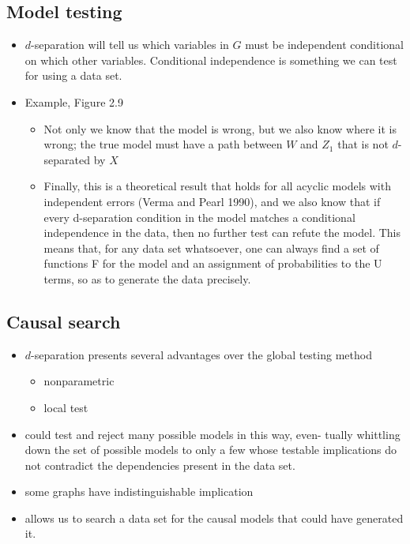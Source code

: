 \documentclass[]{article}
\providecommand{\tightlist}{%
  \setlength{\itemsep}{0pt}\setlength{\parskip}{0pt}}
\begin{document}
\subsection{Model testing}\label{model-testing}

\begin{itemize}
\item
  \(d\)-separation will tell us which variables in \(G\) must be
  independent conditional on which other variables. Conditional
  independence is something we can test for using a data set.
\item
  Example, Figure 2.9

  \begin{itemize}
  \tightlist
  \item
    Not only we know that the model is wrong, but we also know where it
    is wrong; the true model must have a path between \(W\) and \(Z_1\)
    that is not \(d\)-separated by \(X\)
  \item
    Finally, this is a theoretical result that holds for all acyclic
    models with independent errors (Verma and Pearl 1990), and we also
    know that if every d-separation condition in the model matches a
    conditional independence in the data, then no further test can
    refute the model. This means that, for any data set whatsoever, one
    can always find a set of functions F for the model and an assignment
    of probabilities to the U terms, so as to generate the data
    precisely.
  \end{itemize}
\end{itemize}

\subsection{Causal search}\label{causal-search}

\begin{itemize}
\item
  \(d\)-separation presents several advantages over the global testing
  method

  \begin{itemize}
  \tightlist
  \item
    nonparametric
  \item
    local test
  \end{itemize}
\item
  could test and reject many possible models in this way, even- tually
  whittling down the set of possible models to only a few whose testable
  implications do not contradict the dependencies present in the data
  set.
\item
  some graphs have indistinguishable implication
\item
  allows us to search a data set for the causal models that could have
  generated it.
\end{itemize}
\end{document}

